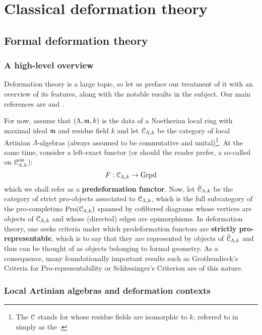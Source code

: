 \section{Classical deformation theory}
    \subsection{Formal deformation theory}
        \subsubsection{A high-level overview}
            Deformation theory is a large topic, so let us preface our treatment of it with an overview of its features, along with the notable results in the subject. Our main references are \cite[\href{https://stacks.math.columbia.edu/tag/06G7}{Tag 06G7}]{stacks} and \cite[\href{https://stacks.math.columbia.edu/tag/08KW}{Tag 08KW}]{stacks}.
            
            For now, assume that $(\Lambda, \mathfrak{m}, k)$ is the data of a Noetherian local ring with maximal ideal $\mathfrak{m}$ and residue field $k$ and let $\mathcal{C}_{\Lambda, k}$ be the category of local Artinian $\Lambda$-algebras (always assumed to be commutative and unital)\footnote{The $\mathcal{C}$ stands for  whose residue fields are isomorphic to $k$, referred to in \cite[\href{https://stacks.math.columbia.edu/tag/06G7}{Tag 06G7}]{stacks} simply as the .}. At the same time, consider a left-exact functor (or should the reader prefer, a so-called  on $\mathcal{C}_{\Lambda, k}^{\mathrm{op}}$):
                $$F: \mathcal{C}_{\Lambda, k} \to \mathrm{Grpd}$$
            which we shall refer as a \textbf{predeformation functor}. Now, let $\hat{\mathcal{C}}_{\Lambda, k}$ be the category of strict pro-objects associated to $\mathcal{C}_{\Lambda, k}$, which is the full subcategory of the pro-completino $\mathrm{Pro}(\mathcal{C}_{\Lambda, k})$ spanned by cofiltered diagrams whose vertices are objects of $\mathcal{C}_{\Lambda, k}$ and whose (directed) edges are epimorphisms. In deformation theory, one seeks criteria under which predeformation functors are \textbf{strictly pro-representable}, which is to say that they are represented by objects of $\hat{\mathcal{C}}_{\Lambda, k}$ and thus can be thought of as objects belonging to formal geometry. As a consequence, many foundationally important results such as Grothendieck's Criteria for Pro-representability or Schlessinger's Criterion are of this nature.
    
        \subsubsection{Local Artinian algebras and deformation contexts}
